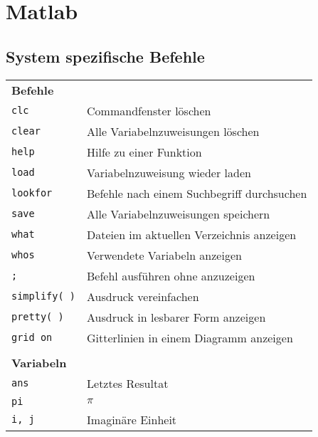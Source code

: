 \section{Matlab}
\subsection{System spezifische Befehle}
\renewcommand{\arraystretch}{1.3}
\begin{minipage}{0.5\textwidth}
  \begin{tabular}{ll}
      \multicolumn{2}{l}{\textbf{Befehle}}
    \\
      \texttt{clc}      & Commandfenster löschen
    \\
  		\texttt{clear}    &	Alle Variabelnzuweisungen löschen
  	\\
  	  \texttt{help}     & Hilfe zu einer Funktion
  	\\
      \texttt{load}     & Variabelnzuweisung wieder laden
    \\
      \texttt{lookfor}  & Befehle nach einem Suchbegriff durchsuchen
    \\
      \texttt{save}     & Alle Variabelnzuweisungen speichern
    \\
      \texttt{what}     & Dateien im aktuellen Verzeichnis anzeigen
    \\
      \texttt{whos}     & Verwendete Variabeln anzeigen
    \\
      \texttt{;}        & Befehl ausführen ohne anzuzeigen
    \\
      \texttt{simplify( )} & Ausdruck vereinfachen
    \\
      \texttt{pretty( )}   & Ausdruck in lesbarer Form anzeigen
    \\
      \texttt{grid on}  & Gitterlinien in einem Diagramm anzeigen

  
\\ \\
    \multicolumn{2}{l}{\textbf{Variabeln}}
    \\
      \texttt{ans}      & Letztes Resultat
    \\
      \texttt{pi}       & $\pi$
    \\
      \texttt{i, j}     & Imaginäre Einheit
  \end{tabular}
\end{minipage} %
